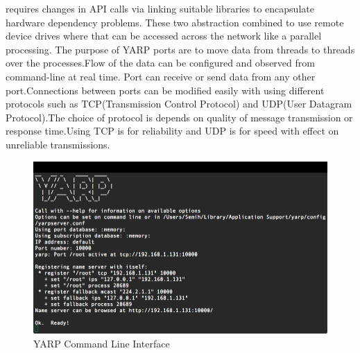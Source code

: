 \documentclass[a4paper, 11pt]{report}
\begin{document}
requires changes in API calls via linking suitable libraries to encapsulate 
hardware dependency problems. These two abstraction combined to use remote 
device drives where that can be accessed across the network like a parallel 
processing.
The purpose of YARP ports are to move data from threads to threads over the 
processes.Flow of the data can be configured and observed from command-line 
at real time. Port can receive or send data from any other port.Connections 
between ports can be modified easily with using different protocols such as 
TCP(Transmission Control Protocol) and UDP(User Datagram Protocol).The choice 
of protocol is depends on quality of message transmission or response 
time.Using TCP is for reliability and UDP is for speed with effect on 
unreliable transmissions.\linebreak

\begin{figure}[h!]
  \centering
  \includegraphics[width=1.0\linewidth]{yarp}
  \caption{YARP Command Line Interface}
  \label{fig:yarp}
\end{figure}
\end{document}
